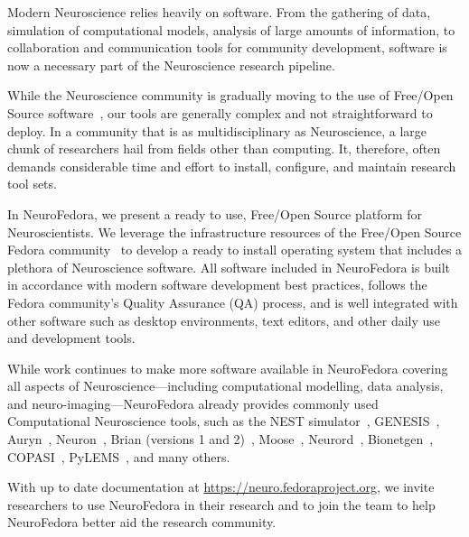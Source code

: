 
Modern Neuroscience relies heavily on software.
From the gathering of data, simulation of computational models, analysis of large amounts of information, to collaboration and communication tools for community development, software is now a necessary part of the Neuroscience research pipeline.

While the Neuroscience community is gradually moving to the use of Free/Open Source software~\cite{Stallman2002,Gleeson2017}, our tools are generally complex and not straightforward to deploy.
In a community that is as multidisciplinary as Neuroscience, a large chunk of researchers hail from fields other than computing.
It, therefore, often demands considerable time and effort to install, configure, and maintain research tool sets.

In NeuroFedora, we present a ready to use, Free/Open Source platform for Neuroscientists.
We leverage the infrastructure resources of the Free/Open Source Fedora community~\cite{RedHat2008} to develop a ready to install operating system that includes a plethora of Neuroscience software.
All software included in NeuroFedora is built in accordance with modern software development best practices, follows the Fedora community's Quality Assurance (QA) process, and is well integrated with other software such as desktop environments, text editors, and other daily use and development tools.

While work continues to make more software available in NeuroFedora covering all aspects of Neuroscience---including computational modelling, data analysis, and neuro-imaging---NeuroFedora already provides commonly used Computational Neuroscience tools, such as the NEST simulator~\cite{Linssen2018}, GENESIS~\cite{Bower2003}, Auryn~\cite{Zenke2014}, Neuron~\cite{Hines1997}, Brian (versions 1 and 2)~\cite{Goodman2009}, Moose~\cite{Dudani2009}, Neurord~\cite{Jedrzejewski2016}, Bionetgen~\cite{Harris2016}, COPASI~\cite{Mendes2009}, PyLEMS~\cite{Vella2014}, and many others.

With up to date documentation at \url{https://neuro.fedoraproject.org}, we invite researchers to use NeuroFedora in their research and to join the team to help NeuroFedora better aid the research community.
